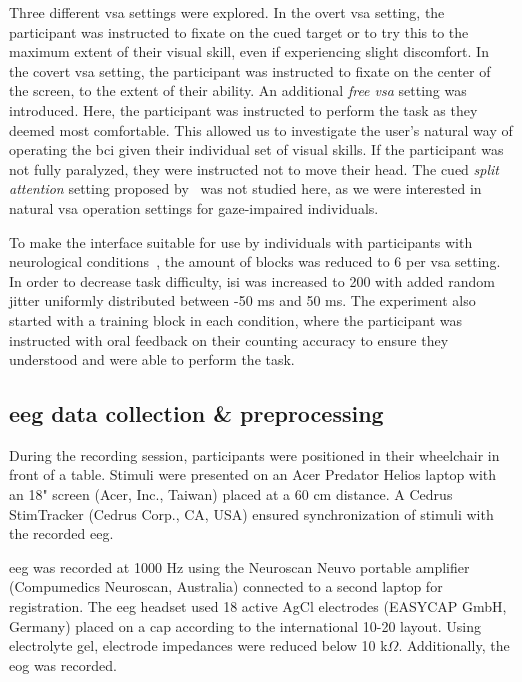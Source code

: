 \documentclass[twocolumn]{article}
\begin{document}
Three different \ac{vsa} settings were explored.
In the overt \ac{vsa} setting, the participant was instructed to fixate on the cued target or
to try this to the maximum extent of their visual skill, even if experiencing
slight discomfort.
In the covert \ac{vsa} setting, the participant was instructed to fixate on the center of the
screen, to the extent of their ability.
An additional \emph{free \ac{vsa}} setting was introduced.
Here, the participant was instructed to perform the task as they deemed most
comfortable.
This allowed us to investigate the user's natural way of operating the \ac{bci}
given their individual set of visual skills.
If the participant was not fully paralyzed, they were instructed not to move their head.
The cued \emph{split attention} setting proposed
by~\textcite{VanDenKerchove2024} was not studied here, as we were interested
in natural \ac{vsa} operation settings for gaze-impaired individuals.

To make the interface suitable for use by individuals with
participants with neurological conditions~\cite{FriedOken2020}, the amount of blocks was reduced to 6 per \ac{vsa} setting.
In order to decrease task difficulty, \ac{isi} was increased to 200 with added random jitter uniformly distributed
between -50 ms and 50 ms.
The experiment also started with a training block in each condition, where the
participant was instructed with oral feedback on their counting accuracy to ensure they
understood and were able to perform the task.


\subsection{\Ac{eeg} data collection \& preprocessing}

During the recording session, participants were positioned in their wheelchair in front of a table.
Stimuli were presented on an Acer Predator Helios laptop with an 18" screen (Acer,
Inc., Taiwan) placed at a 60 cm distance.
A Cedrus StimTracker (Cedrus Corp., CA, USA) ensured synchronization of stimuli with the
recorded \ac{eeg}.

\Ac{eeg} was recorded at 1000 Hz using the Neuroscan Neuvo portable amplifier (Compumedics Neuroscan,
Australia) connected to a second laptop for registration.
The \ac{eeg} headset used 18 active AgCl electrodes (EASYCAP GmbH, Germany) placed on a cap
according to the international 10-20 layout.
Using electrolyte gel, electrode impedances were reduced below 10 k$\Omega$.
Additionally, the \ac{eog} was recorded.
\end{document}
